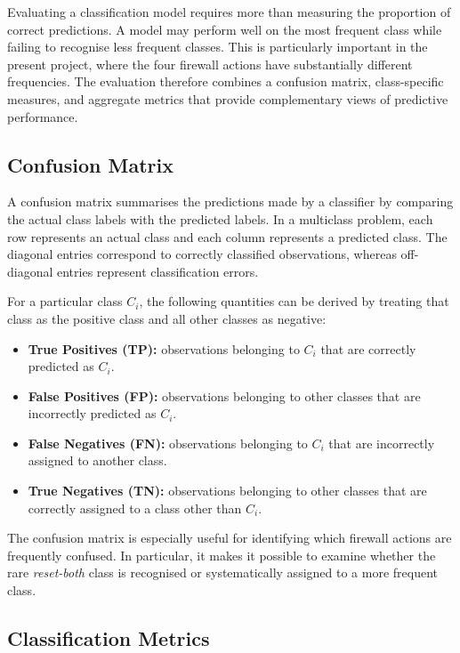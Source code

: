 Evaluating a classification model requires more than measuring the proportion of correct predictions. A model may perform well on the most frequent class while failing to recognise less frequent classes. This is particularly important in the present project, where the four firewall actions have substantially different frequencies. The evaluation therefore combines a confusion matrix, class-specific measures, and aggregate metrics that provide complementary views of predictive performance.

\subsection{Confusion Matrix}

A confusion matrix summarises the predictions made by a classifier by comparing the actual class labels with the predicted labels. In a multiclass problem, each row represents an actual class and each column represents a predicted class. The diagonal entries correspond to correctly classified observations, whereas off-diagonal entries represent classification errors.

For a particular class $C_i$, the following quantities can be derived by treating that class as the positive class and all other classes as negative:

\begin{itemize}
  \item \textbf{True Positives (TP):} observations belonging to $C_i$ that are correctly predicted as $C_i$.
  \item \textbf{False Positives (FP):} observations belonging to other classes that are incorrectly predicted as $C_i$.
  \item \textbf{False Negatives (FN):} observations belonging to $C_i$ that are incorrectly assigned to another class.
  \item \textbf{True Negatives (TN):} observations belonging to other classes that are correctly assigned to a class other than $C_i$.
\end{itemize}

The confusion matrix is especially useful for identifying which firewall actions are frequently confused. In particular, it makes it possible to examine whether the rare \emph{reset-both} class is recognised or systematically assigned to a more frequent class.

\subsection{Classification Metrics}

